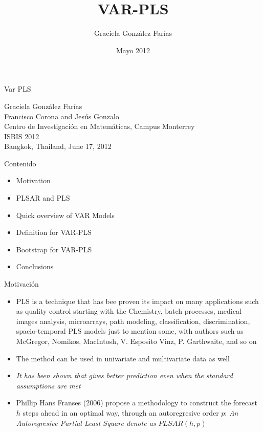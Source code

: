 \documentclass{beamer}
\title[VAR-PLS]{VAR-PLS}
\author[Graciela Gonz\'alez Far\'ias] {Graciela Gonz\'alez Far\' ias}
\institute[CIMAT Monterrey]{CIMAT Monterrey\\
Monterrey, NL.}
\date{Mayo 2012}
\newcommand{\?}{?`}
\begin{document}


\begin{frame}
  \begin{center}
    \begin{block}{}
      \begin{center}
        \vspace{3mm}
        {\Large Var PLS}
        \vspace{3mm}
      \end{center}
    \end{block}
    \vspace{5mm}
    Graciela Gonz\'alez Far\'ias \\
    \vspace{5mm}
    {\small Francisco Corona and Jes\'us Gonzalo \\
    Centro de Investigaci\'on en Matem\'aticas,
      Campus Monterrey\\
      ISBIS 2012\\
      Bangkok, Thailand, June 17, 2012}
    \vspace{5mm}
  \end{center}
\end{frame}


\begin{frame}{Contenido}
  \begin{itemize}
  \item Motivation
  \item PLSAR and PLS
  \item Quick overview of VAR Models
  \item Definition for VAR-PLS
  \item Bootstrap for VAR-PLS
  \item Conclusions
  \end{itemize}
\end{frame}

\begin{frame}{Motivaci\'on}
  \begin{itemize}
    \item PLS is a technique that has bee proven its impact on many applications such as quality control starting with the Chemistry, batch processes, medical images analysis, microarrays, path modeling, classification, discrimination, spacio-temporal PLS models just to mention some, with authors such as McGregor, Nomikos, MacIntosh, V. Esposito Vinz, P. Garthwaite, and so on 
    \item The method can be used in univariate and multivariate data as well
    \item {\it{It has been shown that gives better prediction even when the standard assumptions are met}}
    \item Phillip Hans Franses (2006) propose a methodology to construct the forecast $h$ steps ahead in an optimal way, through an autoregresive order $p$:  {\it{An Autoregresive Partial Least Square denote as  $PLSAR(h,p)$}}
      \end{itemize}
    \end{frame}
\end{document}

